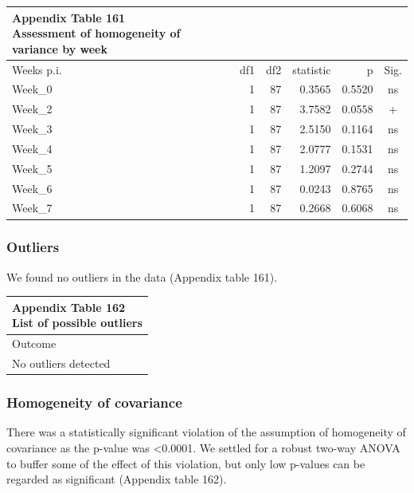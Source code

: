 \documentclass[
  12pt,
  letterpaper,
]{article}
\begin{document}
\begingroup
\fontsize{12.0pt}{14.4pt}\selectfont
\begin{longtable}{l|rrrrc}
\caption*{
{\large \textbf{Appendix Table 161}} \\ 
{\small \textbf{Assessment of homogeneity of variance by week}}
} \\ 
\toprule
Weeks p.i. & {df1} & {df2} & {statistic} & {p} & {Sig.} \\ 
\midrule\addlinespace[2.5pt]
Week\_0 & 1 & 87 & 0.3565 & 0.5520 & ns \\ 
Week\_2 & 1 & 87 & 3.7582 & 0.0558 & + \\ 
Week\_3 & 1 & 87 & 2.5150 & 0.1164 & ns \\ 
Week\_4 & 1 & 87 & 2.0777 & 0.1531 & ns \\ 
Week\_5 & 1 & 87 & 1.2097 & 0.2744 & ns \\ 
Week\_6 & 1 & 87 & 0.0243 & 0.8765 & ns \\ 
Week\_7 & 1 & 87 & 0.2668 & 0.6068 & ns \\ 
\bottomrule
\end{longtable}
\endgroup

\subsubsection{Outliers}\label{outliers-6}

We found no outliers in the data (Appendix table 161).

\begingroup
\fontsize{12.0pt}{14.4pt}\selectfont
\begin{longtable}{l}
\caption*{
{\large \textbf{Appendix Table 162}} \\ 
{\small \textbf{List of possible outliers}}
} \\ 
\toprule
{Outcome} \\ 
\midrule\addlinespace[2.5pt]
No outliers detected \\ 
\bottomrule
\end{longtable}
\endgroup

\subsubsection{Homogeneity of covariance}\label{homogeneity-of-covariance}

There was a statistically significant violation of the assumption of homogeneity of covariance as the p-value was \textless0.0001. We settled for a robust two-way ANOVA to buffer some of the effect of this violation, but only low p-values can be regarded as significant (Appendix table 162).
\end{document}
